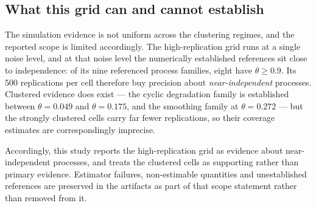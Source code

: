 \subsection{What this grid can and cannot establish}

The simulation evidence is not uniform across the clustering regimes, and the reported scope is limited accordingly. The high-replication grid runs at a single noise level, and at that noise level the numerically established references sit close to independence: of its nine referenced process families, eight have \(\theta \geq 0.9\). Its 500 replications per cell therefore buy precision about \emph{near-independent} processes. Clustered evidence does exist --- the cyclic degradation family is established between \(\theta = 0.049\) and \(\theta = 0.175\), and the smoothing family at \(\theta = 0.272\) --- but the strongly clustered cells carry far fewer replications, so their coverage estimates are correspondingly imprecise.

Accordingly, this study reports the high-replication grid as evidence about near-independent processes, and treats the clustered cells as supporting rather than primary evidence. Estimator failures, non-estimable quantities and unestablished references are preserved in the artifacts as part of that scope statement rather than removed from it.
